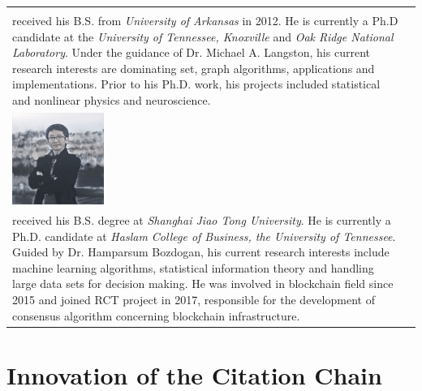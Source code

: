\documentclass[a4paper,oneside,openany]{tufte-book}
\begin{document}
\begin{table}[ht]
\begin{tabular}{ l | l }
\begin{minipage}{40em}
  \emph{Stephen Grady} \\ received his B.S. from \emph{University of Arkansas} in 2012.  He is currently a Ph.D candidate at the \emph{University of Tennessee, Knoxville} and \emph{Oak Ridge National Laboratory}.  Under the guidance of Dr. Michael A. Langston, his current research interests are dominating set, graph algorithms, applications and implementations. Prior to his Ph.D. work, his projects included statistical and nonlinear physics and neuroscience.
\end{minipage} \\
     \includegraphics[width=30mm]{fig/p1} & \begin{minipage}{40em}
  \emph{Yaojin Sun} \\ received his B.S. degree at \emph{Shanghai Jiao Tong University}. He is currently a Ph.D. candidate at \emph{Haslam College of Business, the University of Tennessee}. Guided by Dr. Hamparsum Bozdogan, his current research interests include machine learning algorithms, statistical information theory and handling large data sets for decision making. He was involved in blockchain field since 2015 and joined RCT project in 2017, responsible for the development of consensus algorithm concerning blockchain infrastructure.
\end{minipage}
\end{tabular}
\end{table}



























\chapter{Innovation of the Citation Chain}
\end{document}
